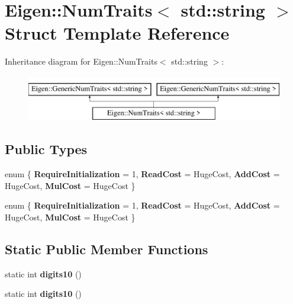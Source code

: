 \hypertarget{struct_eigen_1_1_num_traits_3_01std_1_1string_01_4}{}\section{Eigen\+:\+:Num\+Traits$<$ std\+:\+:string $>$ Struct Template Reference}
\label{struct_eigen_1_1_num_traits_3_01std_1_1string_01_4}
Inheritance diagram for Eigen\+:\+:Num\+Traits$<$ std\+:\+:string $>$\+:\begin{figure}[H]
\begin{center}
\leavevmode
\includegraphics[height=2.000000cm]{struct_eigen_1_1_num_traits_3_01std_1_1string_01_4}
\end{center}
\end{figure}
\subsection*{Public Types}
\begin{DoxyCompactItemize}
\item 
\mbox{\label{struct_eigen_1_1_num_traits_3_01std_1_1string_01_4_afec6a82a40b8d072cdba2c6f7f415765}} 
enum \{ {\bfseries Require\+Initialization} = 1, 
{\bfseries Read\+Cost} = Huge\+Cost, 
{\bfseries Add\+Cost} = Huge\+Cost, 
{\bfseries Mul\+Cost} = Huge\+Cost
 \}
\item 
\mbox{\label{struct_eigen_1_1_num_traits_3_01std_1_1string_01_4_ab15cb4a2ac8107926c33adcff6d0d000}} 
enum \{ {\bfseries Require\+Initialization} = 1, 
{\bfseries Read\+Cost} = Huge\+Cost, 
{\bfseries Add\+Cost} = Huge\+Cost, 
{\bfseries Mul\+Cost} = Huge\+Cost
 \}
\end{DoxyCompactItemize}
\subsection*{Static Public Member Functions}
\begin{DoxyCompactItemize}
\item 
\mbox{\label{struct_eigen_1_1_num_traits_3_01std_1_1string_01_4_a7da9ef6dfd4af0991132f3a8a0149561}} 
static int {\bfseries digits10} ()
\item 
\mbox{\label{struct_eigen_1_1_num_traits_3_01std_1_1string_01_4_a7da9ef6dfd4af0991132f3a8a0149561}} 
static int {\bfseries digits10} ()
\end{DoxyCompactItemize}


